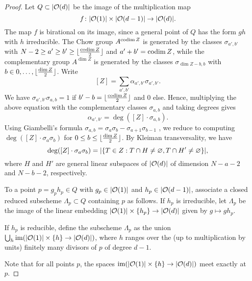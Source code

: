 \begin{proof}
	Let $Q \subset \lvert\mathcal{O}(d)\rvert$ be the image of the multiplication map
		$$f\colon \lvert\mathcal{O}(1)\rvert \times \lvert\mathcal{O}(d-1)\rvert \to \lvert\mathcal{O}(d)\rvert.$$
	The map $f$ is birational on its image, since a general point of $Q$ has the form $gh$ with $h$ irreducible.
	The Chow group $A^{\operatorname{codim} Z}$ is generated by the classes $\sigma_{a',b'}$ with
	$N-2\geq a'\geq b' \geq \lfloor\frac{\operatorname{codim} Z}{2}\rfloor$ and
	$a'+b'=\operatorname{codim} Z$, while the complementary group $A^{\dim Z}$ is generated by the classes
	$\sigma_{\dim Z-b,b}$ with $b\in {0,\dotsc,\lfloor\frac{\dim Z}{2}\rfloor}$.
	Write
		\[
			[Z] = \sum_{a',b'} \alpha_{a',b'} \sigma_{a',b'}. 
		\]
	We have $\sigma_{a',b'} \sigma_{a,b} = 1$ if $b'-b = \lfloor\frac{\operatorname{codim} Z}{2}\rfloor$ and $0$ else. Hence, multiplying the above equation with the complementary classes $\sigma_{a,b}$ and taking degrees gives
		$$
		\alpha_{a',b'} = \deg([Z]\cdot \sigma_{a,b}).
		$$
	Using Giambelli's formula
	$\sigma_{a,b}=\sigma_{a}\sigma_{b} - \sigma_{a+1}\sigma_{b-1}$ \cite[Prop.\ 4.16]{eisenbud-harris-intersection-theory}, we reduce to computing $\deg([Z] \cdot \sigma_{a}\sigma_{b})$ for $0\leq b\leq \lfloor\frac{\dim Z}{2}\rfloor$.
	By Kleiman transversality, we have 
	\[
	\deg([Z] \cdot \sigma_{a}\sigma_{b}) = \lvert\{T\in Z : T \cap H \neq \varnothing, T \cap H' \neq \varnothing\}\rvert,
	\]
	where $H$ and $H'$ are general linear subspaces of $\lvert\mathcal{O}(d)\rvert$ of dimension $N-a-2$ and $N-b-2$, respectively.

	To a point $p = g_p h_p \in Q$ with $g_p \in \lvert\mathcal{O}(1)\rvert$ and $h_p \in \lvert\mathcal{O}(d-1)\rvert$, associate a closed reduced subscheme $\Lambda_p\subset Q$ containing $p$ as follows. If $h_p$ is irreducible, let $\Lambda_p$ be the image of the linear embedding $\lvert\mathcal{O}(1)\rvert\times \{h_p\} \to \lvert\mathcal{O}(d)\rvert$ given by $g \mapsto g h_p$.

	If $h_p$ is reducible, define the subscheme $\Lambda_p$ as the union $\bigcup_h \operatorname{im}(\lvert\mathcal{O}(1)\rvert \times \{h\}\to \lvert\mathcal{O}(d)\rvert)$, where $h$ ranges over the (up to multiplication by units) finitely many divisors of $p$ of degree $d-1$.

	Note that for all points $p$, the spaces $\operatorname{im}(\lvert\mathcal{O}(1)\rvert \times \{h\}\to \lvert\mathcal{O}(d)\rvert)$ meet exactly at $p$.



\end{proof}
